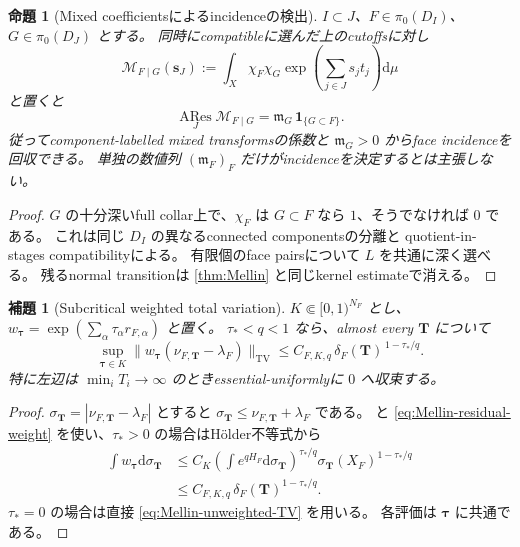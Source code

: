 \documentclass[11pt,a4paper]{ltjsarticle}
\newcommand{\dd}{\mathrm d}
\newcommand{\ARes}{\operatorname*{ARes}}
\theoremstyle{plain}
\newtheorem{proposition}[proposition]{命題}
\newtheorem{lemma}[lemma]{補題}
\theoremstyle{definition}
\theoremstyle{remark}
\begin{document}
\begin{proposition}[Mixed coefficientsによるincidenceの検出]
\label{prop:Mellin-incidence}
$I\subset J$、$F\in\pi_0(D_I)$、$G\in\pi_0(D_J)$ とする。
同時にcompatibleに選んだ上のcutoffsに対し
\[
 \mathscr M_{F\mid G}(\bm s_J)
 :=\int_X\chi_F\chi_G
          \exp\!\left(\sum_{j\in J}s_jt_j\right)\dd\mu
\]
と置くと
\[
 \ARes_J\mathscr M_{F\mid G}
   =\mathfrak m_G\,\mathbf1_{\{G\subset F\}}.
\]
従ってcomponent-labelled mixed transformsの係数と
$\mathfrak m_G>0$ からface incidenceを回収できる。
単独の数値列 $(\mathfrak m_F)_F$ だけがincidenceを決定するとは主張しない。
\end{proposition}
\begin{proof}
$G$ の十分深いfull collar上で、$\chi_F$ は
$G\subset F$ なら $1$、そうでなければ $0$ である。
これは同じ $D_I$ の異なるconnected componentsの分離と
quotient-in-stages compatibilityによる。
有限個のface pairsについて $L$ を共通に深く選べる。
残るnormal transitionは \cref{thm:Mellin} と同じkernel estimateで消える。
\end{proof}

\begin{lemma}[Subcritical weighted total variation]
\label{lem:Mellin-weighted-TV}
$K\Subset[0,1)^{N_F}$ とし、
$w_{\bm\tau}=\exp(\sum_\alpha\tau_\alpha r_{F,\alpha})$ と置く。
$\tau_*<q<1$ なら、almost every $\bm T$ について
\begin{equation}
\label{eq:Mellin-weighted-TV}
 \sup_{\bm\tau\in K}
 \|w_{\bm\tau}(\nu_{F,\bm T}-\lambda_F)\|_{\mathrm{TV}}
 \le C_{F,K,q}\,\delta_F(\bm T)^{\,1-\tau_*/q}.
\end{equation}
特に左辺は $\min_iT_i\to\infty$ のときessential-uniformlyに $0$ へ収束する。
\end{lemma}
\begin{proof}
$\sigma_{\bm T}=|\nu_{F,\bm T}-\lambda_F|$ とすると
$\sigma_{\bm T}\le\nu_{F,\bm T}+\lambda_F$ である。
 と
\eqref{eq:Mellin-residual-weight} を使い、$\tau_*>0$ の場合はH\"older不等式から
\[
 \begin{split}
 \int w_{\bm\tau}\dd\sigma_{\bm T}
 &\le C_K
       \left(\int e^{qH_F}\dd\sigma_{\bm T}\right)^{\tau_*/q}
       \sigma_{\bm T}(X_F)^{1-\tau_*/q}\\
 &\le C_{F,K,q}\,\delta_F(\bm T)^{1-\tau_*/q}.
 \end{split}
\]
$\tau_*=0$ の場合は直接 \eqref{eq:Mellin-unweighted-TV} を用いる。
各評価は $\bm\tau$ に共通である。
\end{proof}
\end{document}
